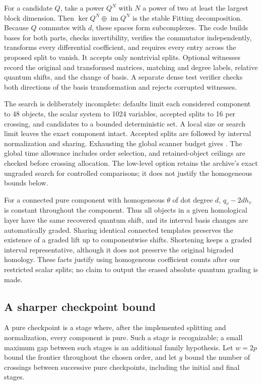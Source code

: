For a candidate $Q$, take a power $Q^N$ with $N$ a power of two at least
the largest block dimension. Then
$\ker Q^N\oplus\operatorname{im}Q^N$ is the stable Fitting decomposition.
Because $Q$ commutes with $d$, these spaces form subcomplexes.
The code builds bases for both parts, checks invertibility, verifies the
commutator independently, transforms every differential coefficient, and
requires every entry across the proposed split to vanish. It accepts only
nontrivial splits. Optional witnesses record the original and transformed
matrices, matching and degree labels, relative quantum shifts, and the
change of basis. A separate dense test verifier checks both directions of
the basis transformation and rejects corrupted witnesses.

The search is deliberately incomplete: defaults limit each considered
component to 48 objects, the scalar system to 1024 variables, accepted
splits to 16 per crossing, and candidates to a bounded deterministic set.
A local size or search limit leaves the exact component intact. Accepted
splits are followed by interval normalization and sharing. Exhausting the
global scanner budget gives . The global time allowance
includes order selection, and retained-object ceilings are checked before
crossing allocation. The low-level  option
retains the archive's exact ungraded search for controlled comparisons;
it does not justify the homogeneous bounds below.

For a connected pure component with homogeneous $\theta$ of dot degree
$d$, $q_v-2d h_v$ is constant throughout the component. Thus all objects
in a given homological layer have the same recovered quantum shift, and
its interval basis changes are automatically graded. Sharing identical
connected templates preserves the existence of a graded lift up to
componentwise shifts. Shortening keeps a graded interval representative,
although it does not preserve the original bigraded homology. These facts
justify using homogeneous coefficient counts after our restricted scalar
splits; no claim to output the erased absolute quantum grading is made.

\subsection{A sharper checkpoint bound}
A pure checkpoint is a stage where, after the implemented splitting and
normalization, every component is pure. Such a stage is recognizable; a
small maximum gap between such stages is an additional family hypothesis.
Let $w=2p$ bound the frontier throughout the chosen order, and let $g$
bound the number of crossings between successive pure checkpoints,
including the initial and final stages.

